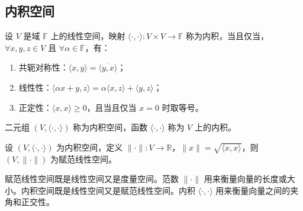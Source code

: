 \vspace{1em}

\subsection{内积空间}

\begin{definition}
    设 $ V $ 是域 $ \mathbb{F} $ 上的线性空间，映射 $ \langle\cdot,\cdot\rangle:V\times V\to \mathbb{F} $ 称为内积，当且仅当，$ \forall x,y,z\in V $ 且 $ \forall \alpha\in \mathbb{F} $，有：
    \begin{enumerate}
        \item 共轭对称性：$ \langle x,y\rangle=\overline{\langle y,x\rangle} $；
        \item 线性性：$ \langle \alpha x+y,z\rangle=\alpha\langle x,z\rangle+\langle y,z\rangle $；
        \item 正定性：$ \langle x,x\rangle\geq 0 $，且当且仅当 $ x=0 $ 时取等号。
    \end{enumerate}
    二元组 $ (V,\langle\cdot,\cdot\rangle) $ 称为内积空间，函数 $ \langle\cdot,\cdot\rangle $ 称为 $ V $ 上的内积。
\end{definition}
\vspace{1em}

\begin{proposition}[内积空间诱导的赋范线性空间]
    设 $ (V,\langle\cdot,\cdot\rangle) $ 为内积空间，定义 $ \|\cdot\|:V\to \mathbb{R} $，$ \|x\|=\sqrt{\langle x,x\rangle} $，则 $ (V,\|\cdot\|) $ 为赋范线性空间。
\end{proposition}
\vspace{1em}

\begin{note}
    赋范线性空间既是线性空间又是度量空间。范数 $ \|\cdot\| $ 用来衡量向量的长度或大小。内积空间既是线性空间又是赋范线性空间。内积 $ \langle\cdot,\cdot\rangle $ 用来衡量向量之间的夹角和正交性。
\end{note}

\newpage
